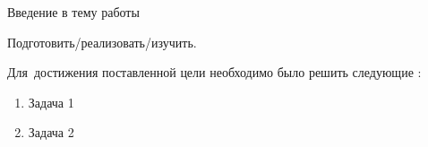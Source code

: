 
{\actuality} Введение в тему работы

{\aim} Подготовить/реализовать/изучить.

Для~достижения поставленной цели необходимо было решить следующие {\tasks}:
\begin{enumerate}
  \item Задача 1
  \item Задача 2
\end{enumerate}
    


